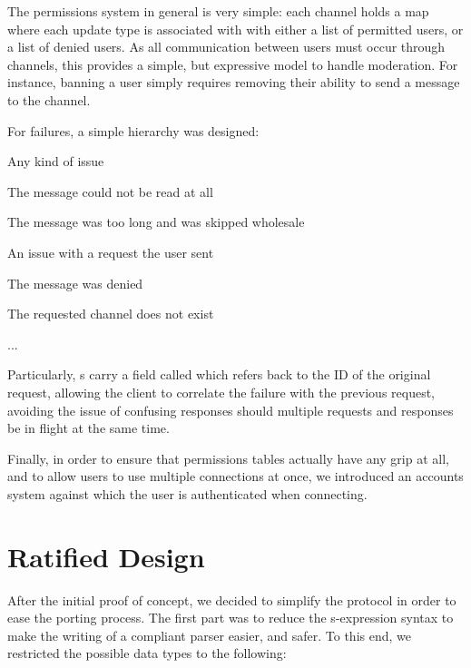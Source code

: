 \documentclass[format=sigconf]{acmart}
\begin{document}
The permissions system in general is very simple: each channel holds a map where each update type is associated with with either a list of permitted users, or a list of denied users. As all communication between users must occur through channels, this provides a simple, but expressive model to handle moderation. For instance, banning a user simply requires removing their ability to send a  message to the channel.

For failures, a simple hierarchy was designed:

\begin{step}
\item {} Any kind of issue
  \begin{step}
  \item {} The message could not be read at all
  \item {} The message was too long and was skipped wholesale
  \item {} An issue with a request the user sent
    \begin{step}
    \item {} The message was denied
    \item {} The requested channel does not exist
    \item ...
    \end{step}
  \end{step}
\end{step}

Particularly, s carry a field called  which refers back to the ID of the original request, allowing the client to correlate the failure with the previous request, avoiding the issue of confusing responses should multiple requests and responses be in flight at the same time.

Finally, in order to ensure that permissions tables actually have any grip at all, and to allow users to use multiple connections at once, we introduced an accounts system against which the user is authenticated when connecting.
      
\section{Ratified Design}\label{ratified-design}
After the initial proof of concept, we decided to simplify the protocol in order to ease the porting process. The first part was to reduce the s-expression syntax to make the writing of a compliant parser easier, and safer. To this end, we restricted the possible data types to the following:
\end{document}
